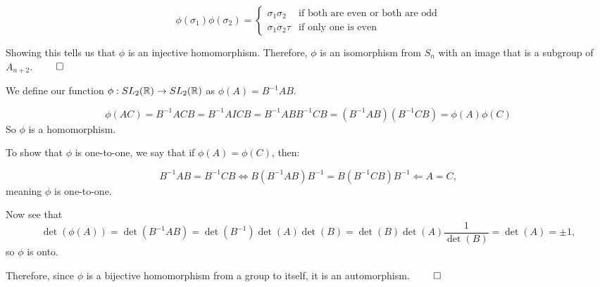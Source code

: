 \documentclass[12pt]{report}
\begin{document}
$$\phi(\sigma_1)\phi(\sigma_2) =  \begin{cases} 
    \sigma_1\sigma_2 & \text{if both are even or both are odd} \\
    \sigma_1\sigma_2\tau & \text{if only one is even}
 \end{cases}
$$

Showing this tells us that $\phi$ is an injective homomorphism. Therefore, $\phi$ is an isomorphism from $S_n$ with an image that is a subgroup of $A_{n+2}$. $\qed$

\sol We define our function $\phi : SL_2(\RR) \to SL_2(\RR)$ as $\phi(A) = B^{-1}AB$. 

$$\phi(AC) = B^{-1}ACB = B^{-1}AICB = B^{-1}ABB^{-1}CB = (B^{-1}AB)(B^{-1}CB) = \phi(A)\phi(C)$$
So $\phi$ is a homomorphism.

To show that $\phi$ is one-to-one, we say that if $\phi(A) = \phi(C)$, then:

$$B^{-1}AB = B^{-1}CB \Longleftrightarrow B(B^{-1}AB)B^{-1} = B(B^{-1}CB)B^{-1} \Longleftarrow A = C,$$ meaning $\phi$ is one-to-one.

Now see that
$$\det(\phi(A))=\det(B^{-1}AB)=\det(B^{-1})\det(A)\det(B)=\det(B)\det(A)\frac{1}{\det(B)}=\det(A)=\pm 1,$$
so $\phi$ is onto.

Therefore, since $\phi$ is a bijective homomorphism from a group to itself, it is an automorphism. $\qed$
\end{document}
